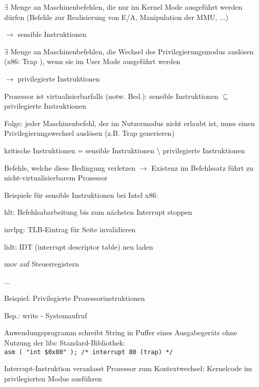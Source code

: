 \documentclass[a4paper]{article}
\begin{document}
\begin{multicols}{3}
    \begin{itemize*}
        \item
        $\exists$ Menge an Maschinenbefehlen, die nur im
        Kernel Mode ausgeführt werden dürfen (Befehle zur Realisierung von
        E/A, Manipulation der MMU, ...)
        \begin{itemize*}
            \item $\rightarrow$ sensible Instruktionen
        \end{itemize*}
        \item
        $\exists$ Menge an Maschinenbefehlen, die Wechsel des
        Privilegierungsmodus auslösen (x86: Trap ), wenn sie im User Mode
        ausgeführt werden
        \begin{itemize*}
            \item $\rightarrow$ privilegierte Instruktionen
        \end{itemize*}
        \item
        Prozessor ist virtualisierbarfalls (notw. Bed.): sensible
        Instruktionen $\subseteq$ privilegierte Instruktionen
        \item
        Folge: jeder Maschinenbefehl, der im Nutzermodus nicht erlaubt ist,
        muss einen Privilegierungswechsel auslösen (z.B. Trap generieren)
        \item
        kritische Instruktionen = sensible Instruktionen \textbackslash{}
        privilegierte Instruktionen
        \begin{itemize*}
            \item Befehle, welche diese Bedingung verletzen $\rightarrow$ Existenz im Befehlssatz führt zu nicht-virtualisierbarem Prozessor
        \end{itemize*}
        \item
        Beispiele für sensible Instruktionen bei Intel x86:
        \begin{itemize*}
            \item hlt: Befehlsabarbeitung bis zum nächsten Interrupt stoppen
            \item invlpg: TLB-Eintrag für Seite invalidieren
            \item lidt: IDT (interrupt descriptor table) neu laden
            \item mov auf Steuerregistern
            \item ...
        \end{itemize*}
        \item
        Beispiel: Privilegierte Prozessorinstruktionen
        \begin{itemize*}
            \item Bsp.: write - Systemaufruf
            \item Anwendungsprogramm schreibt String in Puffer eines Ausgabegeräts ohne Nutzung der libc Standard-Bibliothek: \texttt{asm\ (\ "int\ \$0x80"\ );\ /*\ interrupt\ 80\ (trap)\ */}
            \item Interrupt-Instruktion veranlasst Prozessor zum Kontextwechsel: Kernelcode im privilegierten Modus ausführen
        \end{itemize*}
    \end{itemize*}


\end{multicols}
\end{document}
